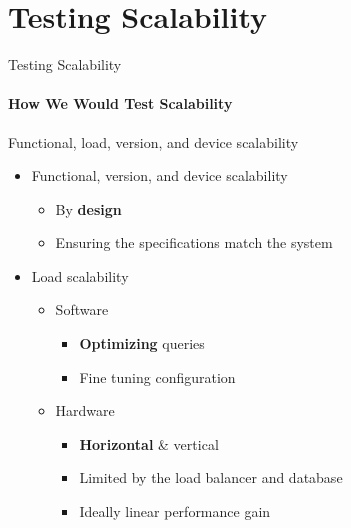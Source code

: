 \section{Testing Scalability}

\begin{frame}{Testing Scalability}
        \framesubtitle{How We Would Test Scalability}
        Functional, load, version, and device scalability
        \begin{itemize}
            \item<1-> Functional, version, and device scalability
                \begin{itemize}
                    \item<1-> By \textbf{design}
                    \item<1-> Ensuring the specifications match the system
                \end{itemize}
            \item<2-> Load scalability
                \begin{itemize}
                    \item<2-> Software
                    \begin{itemize}
                        \item<2-> \textbf{Optimizing} queries
                        \item<2-> Fine tuning configuration
                    \end{itemize}
                    \item<2-> Hardware
                    \begin{itemize}
                        \item<2-> \textbf{Horizontal} \& vertical
                        \item<2-> Limited by the load balancer and database
                        \item<2-> Ideally linear performance gain
                    \end{itemize}
                \end{itemize}
        \end{itemize}
\end{frame}

